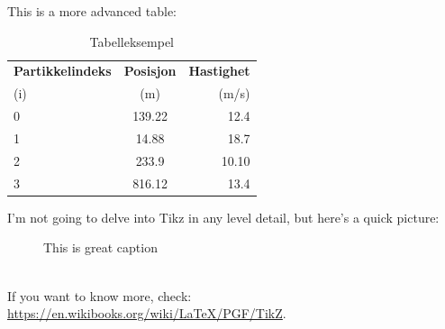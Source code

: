 \documentclass[reprint,english,notitlepage]{revtex4-2}
\begin{document}
This is a more advanced table:
\begin{table}[h!] %
  \begin{center}
    \caption{Tabelleksempel} %
    \label{tab:results}
    \begin{tabular}{l|c|r} %
      \textbf{Partikkelindeks} & \textbf{Posisjon} & \textbf{Hastighet}\\ %
      (i) & (m) & (m/s)\\ %
      \hline %
      0 & 139.22 & 12.4\\
      1 & 14.88 & 18.7\\
      2 & 233.9 & 10.10\\
      3 & 816.12 & 13.4\\
      \hline
    \end{tabular}
  \end{center}
\end{table}



I'm not going to delve into Tikz in any level detail, but here's a quick picture:
\begin{figure}[h]
\centering  %
\caption{This is great caption}\label{figure}
\end{figure}\\
If you want to know more, check: \url{https://en.wikibooks.org/wiki/LaTeX/PGF/TikZ}.

\end{document}
